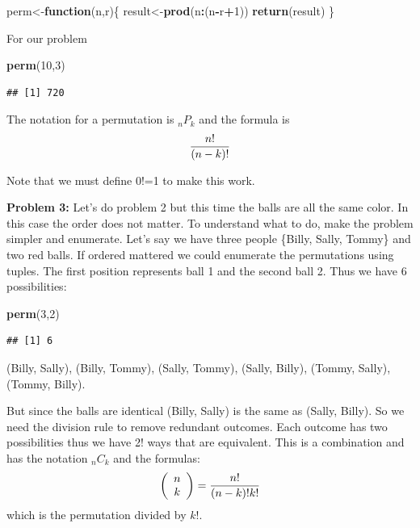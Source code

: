 \documentclass[]{book}
\newenvironment{Shaded}{\begin{snugshade}}{\end{snugshade}}
\newcommand{\KeywordTok}[1]{\textcolor[rgb]{0.13,0.29,0.53}{\textbf{#1}}}
\newcommand{\DecValTok}[1]{\textcolor[rgb]{0.00,0.00,0.81}{#1}}
\newcommand{\ControlFlowTok}[1]{\textcolor[rgb]{0.13,0.29,0.53}{\textbf{#1}}}
\newcommand{\OperatorTok}[1]{\textcolor[rgb]{0.81,0.36,0.00}{\textbf{#1}}}
\newcommand{\NormalTok}[1]{#1}
\theoremstyle{definition}
\theoremstyle{definition}
\theoremstyle{definition}
\theoremstyle{remark}
\begin{document}
\begin{Shaded}
\begin{Highlighting}[]
\NormalTok{perm<-}\ControlFlowTok{function}\NormalTok{(n,r)\{}
\NormalTok{    result<-}\KeywordTok{prod}\NormalTok{(n}\OperatorTok{:}\NormalTok{(n}\OperatorTok{-}\NormalTok{r}\OperatorTok{+}\DecValTok{1}\NormalTok{))}
    \KeywordTok{return}\NormalTok{(result)}
\NormalTok{\}}
\end{Highlighting}
\end{Shaded}

For our problem

\begin{Shaded}
\begin{Highlighting}[]
\KeywordTok{perm}\NormalTok{(}\DecValTok{10}\NormalTok{,}\DecValTok{3}\NormalTok{)}
\end{Highlighting}
\end{Shaded}

\begin{verbatim}
## [1] 720
\end{verbatim}

The notation for a permutation is \(_{n}P_{k}\) and the formula is
\[{n! \over (n-k)!}\]

Note that we must define 0!=1 to make this work.

\textbf{Problem 3:} Let's do problem 2 but this time the balls are all
the same color. In this case the order does not matter. To understand
what to do, make the problem simpler and enumerate. Let's say we have
three people \{Billy, Sally, Tommy\} and two red balls. If ordered
mattered we could enumerate the permutations using tuples. The first
position represents ball 1 and the second ball 2. Thus we have 6
possibilities:

\begin{Shaded}
\begin{Highlighting}[]
\KeywordTok{perm}\NormalTok{(}\DecValTok{3}\NormalTok{,}\DecValTok{2}\NormalTok{)}
\end{Highlighting}
\end{Shaded}

\begin{verbatim}
## [1] 6
\end{verbatim}

(Billy, Sally), (Billy, Tommy), (Sally, Tommy), (Sally, Billy), (Tommy,
Sally), (Tommy, Billy).

But since the balls are identical (Billy, Sally) is the same as (Sally,
Billy). So we need the division rule to remove redundant outcomes. Each
outcome has two possibilities thus we have 2! ways that are equivalent.
This is a combination and has the notation \(_{n}C_{k}\) and the
formulas:
\[\left( {\begin{array}{c}n \\ k \end{array}} \right) = {n! \over (n-k)!k!}\]
which is the permutation divided by \(k!\).
\end{document}
